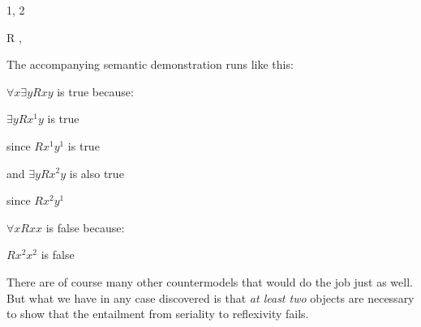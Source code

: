 \begin{center}
\begin{minipage}{0.8\textwidth}
\begin{multicols}{2}
\begin{ekey}
	\item[\text{Domain}] 1, 2
	\item[R] , 
\end{ekey}
\columnbreak
{}
\end{multicols}\end{minipage}\end{center}
The accompanying semantic demonstration runs like this:

\begin{ebullet}
\item $\forall x \exists y Rxy$ is true because:
\begin{etriangle}
\item $\exists yRx^1y$ is true
\begin{etriangle}
\item since $Rx^1y^1$ is true
\end{etriangle}
\item and $\exists yRx^2y$ is also true
\begin{etriangle}
\item since $Rx^2y^1$
\end{etriangle}
\end{etriangle}
\end{ebullet}

\begin{ebullet}
\item $\forall xRxx$ is false because:
\begin{etriangle}
\item $Rx^2x^2$ is false
\end{etriangle}
\end{ebullet}

There are of course many other countermodels that would do the job just as well.  But what we have in any case discovered is that \emph{at least two} objects are necessary to show that the entailment from seriality to reflexivity fails.

